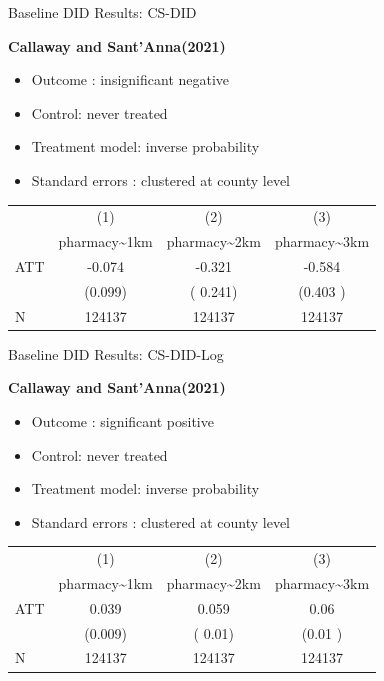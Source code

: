 \documentclass{beamer}
\begin{document}
\begin{frame}{Baseline DID Results: CS-DID}

\textbf{Callaway and Sant'Anna(2021)}

\begin{itemize}
    \item Outcome : insignificant negative
    \item Control: never treated
    \item Treatment model: inverse probability
    \item Standard errors : clustered at  county level
\end{itemize}

\vspace{0.5em}
\centering
\footnotesize
\begin{tabular}{lccc}
\toprule
 & (1) & (2) & (3) \\
 & pharmacy\textasciitilde 1km & pharmacy\textasciitilde 2km & pharmacy\textasciitilde 3km \\
\midrule
ATT &  -0.074  &   -0.321       &    -0.584      \\
    & (0.099) &   ( 0.241)       &  (0.403 )      \\
\midrule
N   &  124137   & 124137   & 124137  \\
\bottomrule
\end{tabular}


\end{frame}



\begin{frame}{Baseline DID Results: CS-DID-Log}

\textbf{Callaway and Sant'Anna(2021)}

\begin{itemize}
    \item Outcome : significant positive
    \item Control: never treated
    \item Treatment model: inverse probability
    \item Standard errors : clustered at  county level
\end{itemize}

\vspace{0.5em}
\centering
\footnotesize
\begin{tabular}{lccc}
\toprule
 & (1) & (2) & (3) \\
 & pharmacy\textasciitilde 1km & pharmacy\textasciitilde 2km & pharmacy\textasciitilde 3km \\
\midrule
ATT &  0.039  &   0.059      &    0.06      \\
    & (0.009) &   ( 0.01)       &  (0.01 )      \\
\midrule
N   &  124137   & 124137   & 124137  \\
\bottomrule
\end{tabular}


\end{frame}
\end{document}
